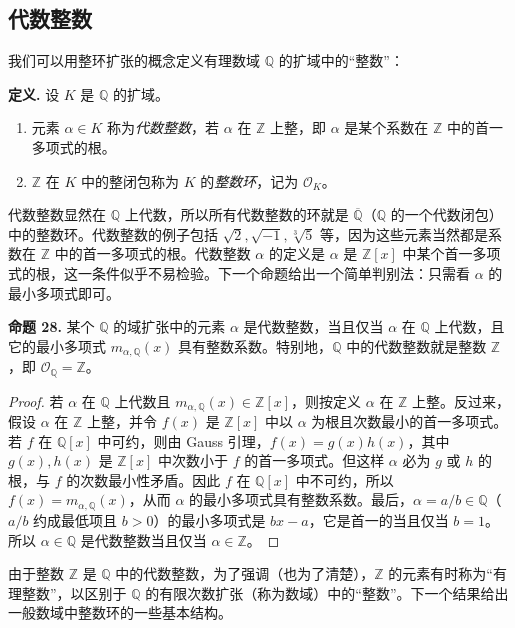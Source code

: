 \subsection*{代数整数}

我们可以用整环扩张的概念定义有理数域 $\mathbb Q$ 的扩域中的“整数”：

\noindent\textbf{定义.} 设 $K$ 是 $\mathbb Q$ 的扩域。
\begin{enumerate}[label=(\arabic*)]
	\item 元素 $\alpha\in K$ 称为\emph{代数整数}，若 $\alpha$ 在 $\mathbb Z$ 上整，即 $\alpha$ 是某个系数在 $\mathbb Z$ 中的首一多项式的根。
	\item $\mathbb Z$ 在 $K$ 中的整闭包称为 $K$ 的\emph{整数环}，记为 $\mathcal O_K$。
\end{enumerate}

代数整数显然在 $\mathbb Q$ 上代数，所以所有代数整数的环就是 $\overline{\mathbb Q}$（$\mathbb Q$ 的一个代数闭包）中的整数环。代数整数的例子包括 $\sqrt2,\sqrt{-1},\sqrt[3]5$ 等，因为这些元素当然都是系数在 $\mathbb Z$ 中的首一多项式的根。代数整数 $\alpha$ 的定义是 $\alpha$ 是 $\mathbb Z[x]$ 中某个首一多项式的根，这一条件似乎不易检验。下一个命题给出一个简单判别法：只需看 $\alpha$ 的最小多项式即可。

\noindent\textbf{命题 28.} 某个 $\mathbb Q$ 的域扩张中的元素 $\alpha$ 是代数整数，当且仅当 $\alpha$ 在 $\mathbb Q$ 上代数，且它的最小多项式 $m_{\alpha,\mathbb Q}(x)$ 具有整数系数。特别地，$\mathbb Q$ 中的代数整数就是整数 $\mathbb Z$，即 $\mathcal O_{\mathbb Q}=\mathbb Z$。

\begin{proof}
	若 $\alpha$ 在 $\mathbb Q$ 上代数且 $m_{\alpha,\mathbb Q}(x)\in\mathbb Z[x]$，则按定义 $\alpha$ 在 $\mathbb Z$ 上整。反过来，假设 $\alpha$ 在 $\mathbb Z$ 上整，并令 $f(x)$ 是 $\mathbb Z[x]$ 中以 $\alpha$ 为根且次数最小的首一多项式。若 $f$ 在 $\mathbb Q[x]$ 中可约，则由 Gauss 引理，$f(x)=g(x)h(x)$，其中 $g(x),h(x)$ 是 $\mathbb Z[x]$ 中次数小于 $f$ 的首一多项式。但这样 $\alpha$ 必为 $g$ 或 $h$ 的根，与 $f$ 的次数最小性矛盾。因此 $f$ 在 $\mathbb Q[x]$ 中不可约，所以 $f(x)=m_{\alpha,\mathbb Q}(x)$，从而 $\alpha$ 的最小多项式具有整数系数。最后，$\alpha=a/b\in\mathbb Q$（$a/b$ 约成最低项且 $b>0$）的最小多项式是 $bx-a$，它是首一的当且仅当 $b=1$。所以 $\alpha\in\mathbb Q$ 是代数整数当且仅当 $\alpha\in\mathbb Z$。
\end{proof}

由于整数 $\mathbb Z$ 是 $\mathbb Q$ 中的代数整数，为了强调（也为了清楚），$\mathbb Z$ 的元素有时称为“有理整数”，以区别于 $\mathbb Q$ 的有限次数扩张（称为数域）中的“整数”。下一个结果给出一般数域中整数环的一些基本结构。

